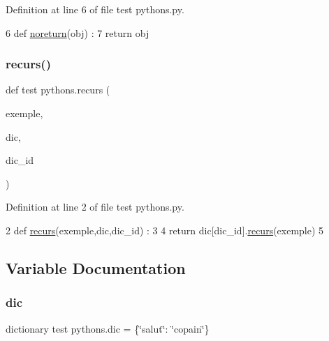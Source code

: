 Definition at line 6 of file test pythons.\+py.


\begin{DoxyCode}
6 \textcolor{keyword}{def }\hyperlink{namespacetest_01pythons_ad81e985019f76816eb5e41aa7aa5503e}{noreturn}(obj) : 
7     \textcolor{keywordflow}{return} obj
\end{DoxyCode}
\mbox{\label{namespacetest_01pythons_a47729b63dec1d2009dac659f3799e58d}} 
\subsubsection{\texorpdfstring{recurs()}{recurs()}}
{\footnotesize\ttfamily def test pythons.\+recurs (\begin{DoxyParamCaption}\item[{}]{exemple,  }\item[{}]{dic,  }\item[{}]{dic\+\_\+id }\end{DoxyParamCaption})}



Definition at line 2 of file test pythons.\+py.


\begin{DoxyCode}
2 \textcolor{keyword}{def }\hyperlink{namespacetest_01pythons_a47729b63dec1d2009dac659f3799e58d}{recurs}(exemple,dic,dic\_id) : 
3 
4     \textcolor{keywordflow}{return} dic[dic\_id].\hyperlink{namespacetest_01pythons_a47729b63dec1d2009dac659f3799e58d}{recurs}(exemple)
5 
\end{DoxyCode}


\subsection{Variable Documentation}
\mbox{\label{namespacetest_01pythons_a5ee650aa154d3ad769048fb3962bd863}} 
\subsubsection{\texorpdfstring{dic}{dic}}
{\footnotesize\ttfamily dictionary test pythons.\+dic = \{\char`\"{}salut\char`\"{}\+: \char`\"{}copain\char`\"{}\}}



